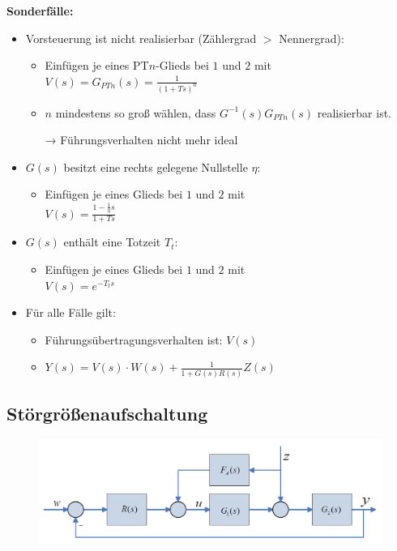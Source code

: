 \documentclass[10pt,a4paper]{article}
\begin{document}
\textbf{Sonderfälle:}
\begin{itemize}
	\item Vorsteuerung ist nicht realisierbar (Zählergrad $>$ Nennergrad):
	\begin{itemize}
		\item Einfügen je eines PT$n$-Glieds bei $1$ und $2$ mit \\
		$V(s) = G_{PTn}(s) = \frac{1}{(1 + Ts)^n}$
		\item $n$ mindestens so groß wählen, dass $G^{-1}(s)G_{PTn}(s)$ realisierbar ist.
		\item[→] Führungsverhalten nicht mehr ideal
	\end{itemize}
	\item $G(s)$ besitzt eine rechts gelegene Nullstelle $\eta$:
	\begin{itemize}
		\item Einfügen je eines Glieds bei $1$ und $2$ mit \\
		$V(s) = \frac{1 - \frac 1 \eta s}{1 + Ts}$
	\end{itemize}
	\item  $G(s)$ enthält eine Totzeit $T_t$:
	\begin{itemize}
		\item Einfügen je eines Glieds bei $1$ und $2$ mit \\
		$V(s) = e^{-T_ts}$
	\end{itemize}
	\item Für alle Fälle gilt:
	\begin{itemize}
		\item Führungsübertragungsverhalten ist: $V(s)$
		\item $Y(s) = V(s) ⋅ W(s) + \frac{1}{1 + G(s) R(s)} Z(s)$
	\end{itemize}
	
\end{itemize}

\subsection{Störgrößenaufschaltung}
\begin{figure}[H]
	\includegraphics[width=0.7\columnwidth]{imgs/abb7_4.png}
\end{figure}
\end{document}
